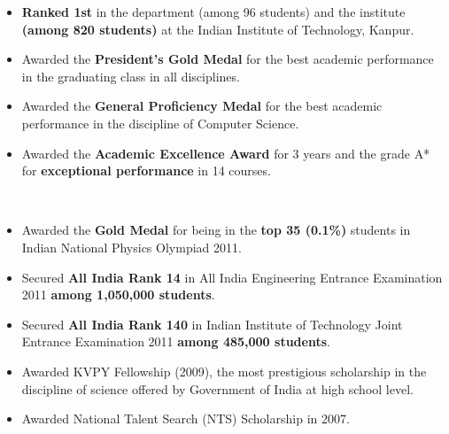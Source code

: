 \documentclass{scrartcl}
\begin{document}
\begin{cv}{}
{\begin{itemize}
\item[\Forward] \textbf{Ranked 1st} in the department (among 96 students) and the institute \textbf{(among 820 students)} at the Indian Institute of Technology, Kanpur.\\
\item[\Forward] Awarded the \textbf{President's Gold Medal} for the best academic performance in the graduating class in all disciplines.\\
\item[\Forward] Awarded the \textbf{General Proficiency Medal} for the best academic performance in the discipline of Computer Science.\\
\item[\Forward] Awarded the \textbf{Academic Excellence Award} for 3 years and the grade A* for \textbf{exceptional performance} in 14 courses.
\end{itemize}
\hfill \\
\begin{itemize}
\item[\Forward] Awarded the \textbf{Gold Medal} for being in the \textbf{top 35 (0.1\%)} students in Indian National Physics Olympiad 2011.\\
\item[\Forward] Secured \textbf{All India Rank 14} in All India Engineering Entrance Examination 2011 \textbf{among 1,050,000 students}.\\
\item[\Forward] Secured \textbf{All India Rank 140} in Indian Institute of Technology Joint Entrance Examination 2011 \textbf{among 485,000 students}.\\
\item[\Forward] Awarded KVPY Fellowship (2009), the most prestigious scholarship in the discipline of science offered by Government of India at high school level.\\
\item[\Forward] Awarded National Talent Search (NTS) Scholarship in 2007.
\end{itemize}}


\end{cv}
\end{document}
